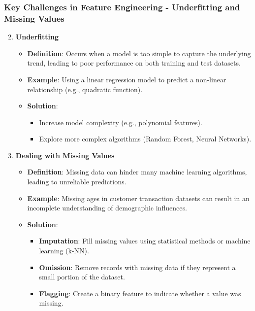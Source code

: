 \documentclass[aspectratio=169]{beamer}
\begin{document}
\begin{frame}[fragile]
    \frametitle{Key Challenges in Feature Engineering - Underfitting and Missing Values}
    \begin{enumerate}
        \setcounter{enumi}{1}
        \item \textbf{Underfitting}
        \begin{itemize}
            \item \textbf{Definition}: Occurs when a model is too simple to capture the underlying trend, leading to poor performance on both training and test datasets.
            \item \textbf{Example}: Using a linear regression model to predict a non-linear relationship (e.g., quadratic function).
            \item \textbf{Solution}:
            \begin{itemize}
                \item Increase model complexity (e.g., polynomial features).
                \item Explore more complex algorithms (Random Forest, Neural Networks).
            \end{itemize}
        \end{itemize}

        \item \textbf{Dealing with Missing Values}
        \begin{itemize}
            \item \textbf{Definition}: Missing data can hinder many machine learning algorithms, leading to unreliable predictions.
            \item \textbf{Example}: Missing ages in customer transaction datasets can result in an incomplete understanding of demographic influences.
            \item \textbf{Solution}:
            \begin{itemize}
                \item \textbf{Imputation}: Fill missing values using statistical methods or machine learning (k-NN).
                \item \textbf{Omission}: Remove records with missing data if they represent a small portion of the dataset.
                \item \textbf{Flagging}: Create a binary feature to indicate whether a value was missing.
            \end{itemize}
        \end{itemize}
    \end{enumerate}
\end{frame}
\end{document}
